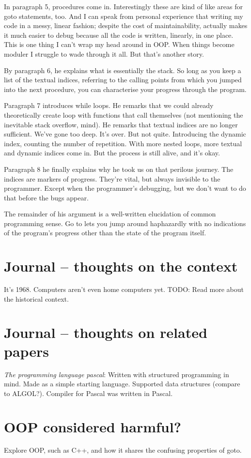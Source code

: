 \documentclass{journal}
\begin{document}
In paragraph 5, procedures come in. Interestingly these are kind of like areas for goto statements, too. And I can speak from personal experience that writing my code in a messy, linear fashion; despite the cost of maintainability, actually makes it much easier to debug because all the code is written, linearly, in one place. This is one thing I can't wrap my head around in OOP. When things become moduler I struggle to wade through it all. But that's another story.

By paragraph 6, he explains what is essentially the stack. So long as you keep a list of the textual indices, referring to the calling points from which you jumped into the next procedure, you can characterise your progress through the program.

Paragraph 7 introduces while loops. He remarks that we could already theoretically create loop with functions that call themselves (not mentioning the inevitable stack overflow, mind). He remarks that textual indices are no longer sufficient. We've gone too deep. It's over. But not quite. Introducing the dynamic index, counting the number of repetition. With more nested loops, more textual and dynamic indices come in. But the process is still alive, and it's okay.

Paragraph 8 he finally explains why he took us on that perilous journey. The indices are markers of progress. They're vital, but always invisible to the programmer. Except when the programmer's debugging, but we don't want to do that before the bugs appear.

The remainder of his argument is a well-written elucidation of common programming sense. Go to lets you jump around haphazardly with no indications of the program's progress other than the state of the program itself. 

\section{Journal -- thoughts on the context}
It's 1968. Computers aren't even home computers yet. TODO: Read more about the historical context.

\section{Journal -- thoughts on related papers}
\textit{The programming language pascal}: Written with structured programming in mind. Made as a simple starting language. Supported data structures (compare to ALGOL?). Compiler for Pascal was written in Pascal.

\section{OOP considered harmful?}
Explore OOP, such as C++, and how it shares the confusing properties of goto.



\end{document}
